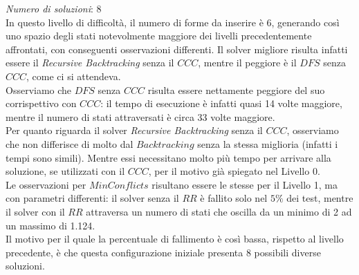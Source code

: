 \textit{Numero di soluzioni}: 8\\

In questo livello di difficoltà, il numero di forme da inserire è 6, generando così uno spazio degli stati notevolmente maggiore dei livelli precedentemente affrontati, con conseguenti osservazioni differenti.
Il solver migliore risulta infatti essere il \textit{Recursive Backtracking} senza il $CCC$, mentre il peggiore è il $DFS$ senza $CCC$, come ci si attendeva.\\

Osserviamo che $DFS$ senza $CCC$ risulta essere nettamente peggiore del suo corrispettivo con $CCC$: il tempo di esecuzione è infatti quasi 14 volte maggiore, mentre il numero di stati attraversati è circa 33 volte maggiore.\\

Per quanto riguarda il solver \textit{Recursive Backtracking} senza il $CCC$, osserviamo che non differisce di molto dal $Backtracking$ senza la stessa miglioria (infatti i tempi sono simili). Mentre essi necessitano molto più tempo per arrivare alla soluzione, se utilizzati con il $CCC$, per il motivo già spiegato nel Livello 0.\\

Le osservazioni per $MinConflicts$ risultano essere le stesse per il Livello 1, ma con parametri differenti: il solver senza il $RR$ è fallito solo nel $5\%$ dei test, mentre il solver con il $RR$ attraversa un numero di stati che oscilla da un minimo di 2 ad un massimo di 1.124.\\
Il motivo per il quale la percentuale di fallimento è così bassa, rispetto al livello precedente, è che questa configurazione iniziale presenta 8 possibili diverse soluzioni.
